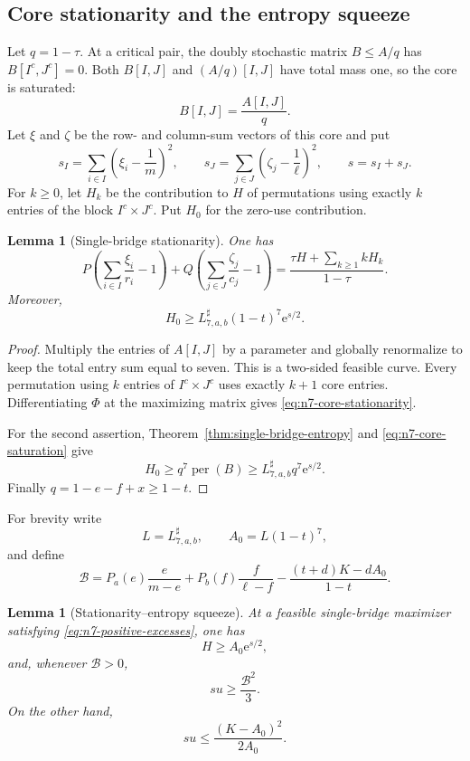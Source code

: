 \documentclass[11pt]{article}
\newtheorem{lemma}[theorem]{Lemma}
\theoremstyle{definition}
\newcommand{\per}{\operatorname{per}}
\newcommand{\1}{\mathbf{1}}
\newcommand{\e}{\mathrm{e}}
\begin{document}
\subsection{Core stationarity and the entropy squeeze}

Let $q=1-\tau$.  At a critical pair, the doubly stochastic matrix
$B\le A/q$ has $B[I^c,J^c]=0$.  Both $B[I,J]$ and $(A/q)[I,J]$ have total
mass one, so the core is saturated:
\[
 B[I,J]=\frac{A[I,J]}q.
 \tag{8.25}\label{eq:n7-core-saturation}
\]
Let $\xi$ and $\zeta$ be the row- and column-sum vectors of this core and
put
\[
 s_I=\sum_{i\in I}\left(\xi_i-\frac1m\right)^2,
 \qquad
 s_J=\sum_{j\in J}\left(\zeta_j-\frac1\ell\right)^2,
 \qquad
 s=s_I+s_J.
 \tag{8.26}\label{eq:n7-core-s}
\]
For $k\ge0$, let $H_k$ be the contribution to $H$ of permutations using
exactly $k$ entries of the block $I^c\times J^c$.  Put $H_0$ for the
zero-use contribution.

\begin{lemma}[Single-bridge stationarity]\label{lem:n7-core-stationarity}
One has
\[
 P\left(\sum_{i\in I}\frac{\xi_i}{r_i}-1\right)
 +Q\left(\sum_{j\in J}\frac{\zeta_j}{c_j}-1\right)
 =\frac{\tau H+\sum_{k\ge1}kH_k}{1-\tau}.
 \tag{8.27}\label{eq:n7-core-stationarity}
\]
Moreover,
\[
 H_0\ge
 L^{\sharp}_{7,a,b}(1-t)^7\e^{s/2}.
 \tag{8.28}\label{eq:n7-H0-entropy}
\]
\end{lemma}

\begin{proof}
Multiply the entries of $A[I,J]$ by a parameter and globally renormalize to
keep the total entry sum equal to seven.  This is a two-sided feasible curve.
Every permutation using $k$ entries of $I^c\times J^c$ uses exactly $k+1$
core entries.  Differentiating $\Phi$ at the maximizing matrix gives
\eqref{eq:n7-core-stationarity}.

For the second assertion, Theorem~\ref{thm:single-bridge-entropy} and
\eqref{eq:n7-core-saturation} give
\[
 H_0\ge q^7\per(B)
 \ge L^{\sharp}_{7,a,b}q^7\e^{s/2}.
\]
Finally $q=1-e-f+x\ge1-t$.
\end{proof}

For brevity write
\[
 L=L^{\sharp}_{7,a,b},
 \qquad
 A_0=L(1-t)^7,
 \tag{8.29}\label{eq:n7-A0}
\]
and define
\[
 \mathcal B=
 P_a(e)\frac{e}{m-e}
 +P_b(f)\frac{f}{\ell-f}
 -\frac{(t+d)K-dA_0}{1-t}.
 \tag{8.30}\label{eq:n7-Bcal}
\]

\begin{lemma}[Stationarity--entropy squeeze]\label{lem:n7-squeeze}
At a feasible single-bridge maximizer satisfying
\eqref{eq:n7-positive-excesses}, one has
\[
 H\ge A_0\e^{s/2},
 \tag{8.31}\label{eq:n7-entropy-lower}
\]
and, whenever $\mathcal B>0$,
\[
 su\ge\frac{\mathcal B^2}{3}.
 \tag{8.32}\label{eq:n7-su-lower}
\]
On the other hand,
\[
 su\le\frac{(K-A_0)^2}{2A_0}.
 \tag{8.33}\label{eq:n7-su-upper}
\]
\end{lemma}
\end{document}

